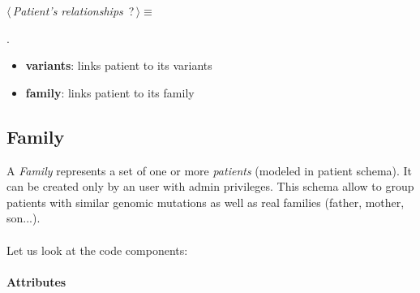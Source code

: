 	\begin{flushleft} \small
\begin{minipage}{\linewidth}\label{scrap14}\raggedright\small
{} $\langle\,${\itshape {Patient's relationships}}\nobreak\ {\footnotesize {?}}$\,\rangle\equiv$
\vspace{-1ex}
\begin{list}{}{} \item

                
        {\NWsep}
\end{list}
\vspace{-1.5ex}
\footnotesize
\begin{list}{}{\setlength{\itemsep}{-\parsep}\setlength{\itemindent}{-\leftmargin}}
\item {\NWtxtMacroNoRef}.

\item{}
\end{list}
\end{minipage}\vspace{4ex}
\end{flushleft}
\begin{itemize}
 	\item \textbf{variants}: links patient to its variants
 	\item \textbf{family}: links patient to its family
\end{itemize}


\subsection{Family}
A \emph{Family} represents a set of one or more \emph{patients} (modeled in patient schema). It can be created only by an user with admin privileges. This schema allow to group patients with similar genomic mutations as well as real families (father, mother, son{...}).
\\
\\Let us look at the code components:

\paragraph{Attributes}      

